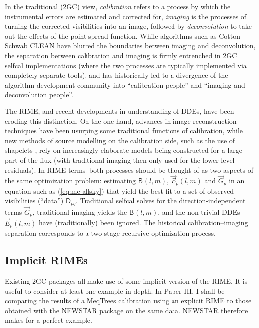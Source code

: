 \documentclass[referee]{aa}
\newcommand{\jones}[2]{\vec {#1}_{#2}}
\newcommand{\coh}[2]{\mathsf{{#1}}_{{#2}}}
\begin{document}
In the traditional (2GC) view, \emph{calibration} refers to a process by which the instrumental errors are estimated and corrected for, \emph{imaging} is the processes of turning the corrected visibilities into an image, followed by \emph{deconvolution} to take out the effects of the point spread function. While algorithms such as Cotton-Schwab CLEAN \citep{Schwab:csclean} have blurred the boundaries between imaging and deconvolution, the separation between calibration and imaging is firmly entrenched in 2GC selfcal implementations (where the two processes are typically implemented via completely separate tools), and has historically led to a divergence of the algorithm development community into ``calibration people'' and ``imaging and deconvolution people''. 

The RIME, and recent developments in understanding of DDEs, have been eroding this distinction. On the one hand, advances in image reconstruction techniques \citep[for an overview, see][]{Rau:DDEs} have been usurping some traditional functions of calibration, while new methods of source modelling on the calibration side, such as the use of shapelets \citep{Yatawatta:shapelets}, rely on increasingly elaborate models being constructed for a large part of the flux (with traditional imaging then only used for the lower-level residuals). In RIME terms, both processes should be thought of as two aspects of the same optimization problem: estimating $\coh{B}{}(l,m)$, $\jones{E}{p}(l,m)$ and $\jones{G}{p}$ in an equation such as (\ref{eq:me-allsky}) that yield the best fit to a set of observed visibilities  (``data'') $\coh{D}{pq}$. Traditional selfcal solves for the direction-independent terms $\jones{G}{p}$, traditional imaging yields the $\coh{B}{}(l,m)$, and the non-trivial DDEs $\jones{E}{p}(l,m)$ have (traditionally) been ignored. The historical calibration--imaging separation corresponds to a two-stage recursive optimization process. 

\subsection{\label{sec:implicit-me-newstar}Implicit RIMEs}

Existing 2GC packages all make use of some implicit version of the RIME. It is useful to consider at least one example in depth. In Paper III, I shall be comparing the results of a MeqTrees calibration using an explicit RIME to those obtained with the NEWSTAR package on the same data. NEWSTAR therefore makes for a perfect example.
\end{document}
